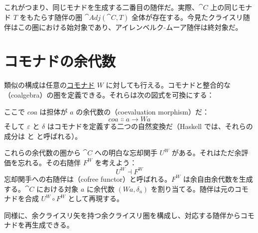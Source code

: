 これがつまり、同じモナドを生成する二番目の随伴だ。実際、$\cat{C}$ 上の同じモナド $T$ をもたらす随伴の圏 $\cat{Adj}(\cat{C}, T)$ 全体が存在する。今見たクライスリ随伴はこの圏における始対象であり、アイレンベルク-ムーア随伴は終対象だ。

\section{コモナドの余代数}

類似の構成は任意の\hyperref[comonads]{コモナド} $W$ に対しても行える。コモナドと整合的な（coalgebra）の圏を定義できる。それらは次の図式を可換にする：

\begin{figure}[H]
  \centering
  \begin{subfigure}
    \centering
  \end{subfigure}%
  \hspace{1cm}
  \begin{subfigure}
    \centering
  \end{subfigure}
\end{figure}

\noindent
ここで $\mathit{coa}$ は担体が $a$ の余代数の（coevaluation morphism）だ：
\[\mathit{coa} \Colon a \to W a\]
そして $\varepsilon$ と $\delta$ はコモナドを定義する二つの自然変換だ（Haskell では、それらの成分は  と  と呼ばれる）。

これらの余代数の圏から $\cat{C}$ への明白な忘却関手 $U^W$ がある。それはただ余評価を忘れる。その右随伴 $F^W$ を考えよう：
\[U^W \dashv F^W\]
忘却関手への右随伴は（cofree functor）と呼ばれる。$F^W$ は余自由余代数を生成する。$\cat{C}$ における対象 $a$ に余代数 $(W a, \delta_a)$ を割り当てる。随伴は元のコモナドを合成 $U^W \circ F^W$ として再現する。

同様に、余クライスリ矢を持つ余クライスリ圏を構成し、対応する随伴からコモナドを再生成できる。

